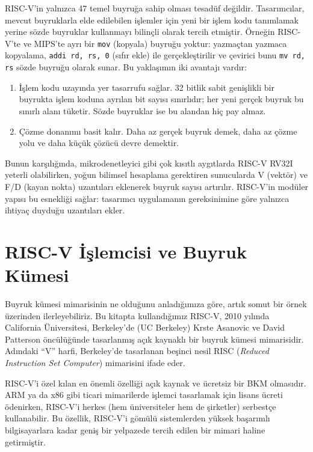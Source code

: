 RISC-V'in yalnızca 47 temel buyruğa sahip olması tesadüf değildir. Tasarımcılar, mevcut buyruklarla elde edilebilen işlemler için yeni bir işlem kodu tanımlamak yerine sözde buyruklar kullanmayı bilinçli olarak tercih etmiştir. Örneğin RISC-V'te ve MIPS'te ayrı bir \texttt{mov} (kopyala) buyruğu yoktur: yazmaçtan yazmaca kopyalama, \texttt{addi rd, rs, 0} (sıfır ekle) ile gerçekleştirilir ve çevirici bunu \texttt{mv rd, rs} sözde buyruğu olarak sunar. Bu yaklaşımın iki avantajı vardır:

\begin{enumerate}[nosep]
\item İşlem kodu uzayında yer tasarrufu sağlar. 32 bitlik sabit genişlikli bir buyrukta işlem koduna ayrılan bit sayısı sınırlıdır; her yeni gerçek buyruk bu sınırlı alanı tüketir. Sözde buyruklar ise bu alandan hiç pay almaz.
\item Çözme donanımı basit kalır. Daha az gerçek buyruk demek, daha az çözme yolu ve daha küçük çözücü devre demektir.
\end{enumerate}

Bunun karşılığında, mikrodenetleyici gibi çok kısıtlı aygıtlarda RISC-V RV32I yeterli olabilirken, yoğun bilimsel hesaplama gerektiren sunucularda V (vektör) ve F/D (kayan nokta) uzantıları eklenerek buyruk sayısı artırılır. RISC-V'in modüler yapısı bu esnekliği sağlar: tasarımcı uygulamanın gereksinimine göre yalnızca ihtiyaç duyduğu uzantıları ekler.

\section{RISC-V İşlemcisi ve Buyruk Kümesi}
\label{sec:riscv-islemcisi}

Buyruk kümesi mimarisinin ne olduğunu anladığımıza göre, artık somut bir örnek üzerinden ilerleyebiliriz. Bu kitapta kullandığımız RISC-V, 2010 yılında California Üniversitesi, Berkeley'de (UC Berkeley) Krste Asanovic ve David Patterson öncülüğünde tasarlanmış açık kaynaklı bir buyruk kümesi mimarisidir. Adındaki ``V'' harfi, Berkeley'de tasarlanan beşinci nesil RISC (\textit{Reduced Instruction Set Computer}) mimarisini ifade eder.

RISC-V'i özel kılan en önemli özelliği açık kaynak ve ücretsiz bir BKM olmasıdır. ARM ya da x86 gibi ticari mimarilerde işlemci tasarlamak için lisans ücreti ödenirken, RISC-V'i herkes (hem üniversiteler hem de şirketler) serbestçe kullanabilir. Bu özellik, RISC-V'i gömülü sistemlerden yüksek başarımlı bilgisayarlara kadar geniş bir yelpazede tercih edilen bir mimari haline getirmiştir.

